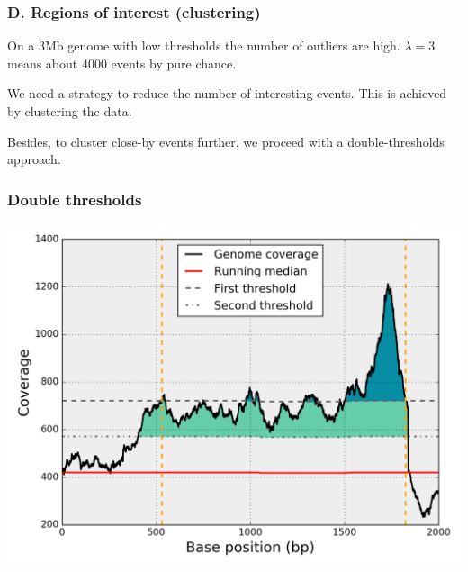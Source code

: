 \documentclass{beamer}
\begin{document}
\begin{frame}
\frametitle{D. Regions of interest (clustering)}

\begin{block}{}
On a 3Mb genome with low thresholds the number of outliers are high. 
$\lambda=3$ means about 4000 events by pure chance.
\end{block}

\begin{block}{}
We need a strategy to reduce the number of interesting events. This is 
achieved by clustering the data.
\end{block}

\begin{block}{}
Besides, to cluster close-by events further, we proceed with a 
double-thresholds 
approach.
\end{block}
 
\end{frame}


\begin{frame}
 \frametitle{Double thresholds}
\includegraphics[height=0.9\textheight, 
    width=1\textwidth]{images/double_threshold.png}
\end{frame}
\end{document}
